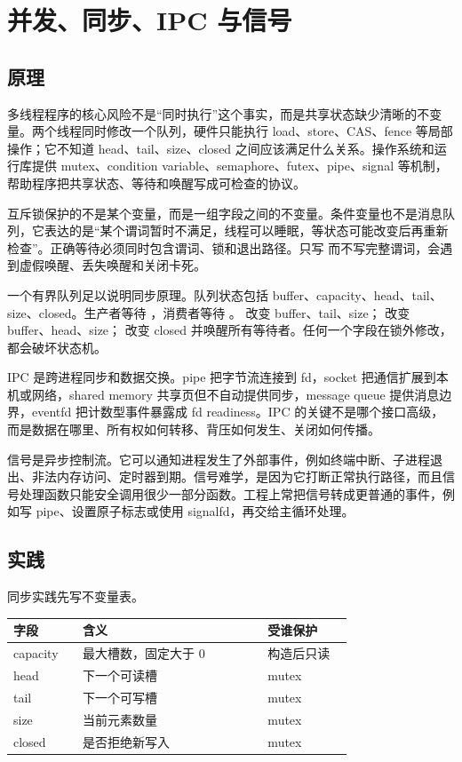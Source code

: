 \chapter{并发、同步、IPC 与信号}

\section{原理}

多线程程序的核心风险不是“同时执行”这个事实，而是共享状态缺少清晰的不变量。两个线程同时修改一个队列，硬件只能执行 load、store、CAS、fence 等局部操作；它不知道 head、tail、size、closed 之间应该满足什么关系。操作系统和运行库提供 mutex、condition variable、semaphore、futex、pipe、signal 等机制，帮助程序把共享状态、等待和唤醒写成可检查的协议。

互斥锁保护的不是某个变量，而是一组字段之间的不变量。条件变量也不是消息队列，它表达的是“某个谓词暂时不满足，线程可以睡眠，等状态可能改变后再重新检查”。正确等待必须同时包含谓词、锁和退出路径。只写  而不写完整谓词，会遇到虚假唤醒、丢失唤醒和关闭卡死。

一个有界队列足以说明同步原理。队列状态包括 buffer、capacity、head、tail、size、closed。生产者等待 ，消费者等待 。 改变 buffer、tail、size； 改变 buffer、head、size； 改变 closed 并唤醒所有等待者。任何一个字段在锁外修改，都会破坏状态机。

IPC 是跨进程同步和数据交换。pipe 把字节流连接到 fd，socket 把通信扩展到本机或网络，shared memory 共享页但不自动提供同步，message queue 提供消息边界，eventfd 把计数型事件暴露成 fd readiness。IPC 的关键不是哪个接口高级，而是数据在哪里、所有权如何转移、背压如何发生、关闭如何传播。

信号是异步控制流。它可以通知进程发生了外部事件，例如终端中断、子进程退出、非法内存访问、定时器到期。信号难学，是因为它打断正常执行路径，而且信号处理函数只能安全调用很少一部分函数。工程上常把信号转成更普通的事件，例如写 pipe、设置原子标志或使用 signalfd，再交给主循环处理。

\section{实践}

同步实践先写不变量表。

\begin{longtable}{|p{0.18\linewidth}|p{0.48\linewidth}|p{0.22\linewidth}|}
\toprule
字段 & 含义 & 受谁保护 \\
\midrule
capacity & 最大槽数，固定大于 0 & 构造后只读 \\\tablerowrule
head & 下一个可读槽 & mutex \\\tablerowrule
tail & 下一个可写槽 & mutex \\\tablerowrule
size & 当前元素数量 & mutex \\\tablerowrule
closed & 是否拒绝新写入 & mutex \\
\bottomrule
\end{longtable}


